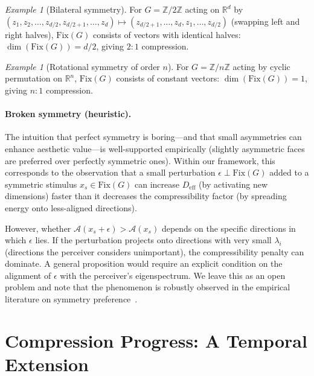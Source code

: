 \documentclass[journal]{IEEEtran}
\theoremstyle{definition}
\theoremstyle{remark}
\newtheorem{example}[theorem]{Example}
\newcommand{\R}{\mathbb{R}}
\begin{document}
\begin{example}[Bilateral symmetry]
For $G = \mathbb{Z}/2\mathbb{Z}$ acting on $\R^d$ by
$(z_1, z_2, \ldots, z_{d/2}, z_{d/2+1}, \ldots, z_d) \mapsto
(z_{d/2+1}, \ldots, z_d, z_1, \ldots, z_{d/2})$ (swapping left and
right halves), $\mathrm{Fix}(G)$ consists of vectors with identical
halves: $\dim(\mathrm{Fix}(G)) = d/2$, giving $2:1$ compression.
\end{example}

\begin{example}[Rotational symmetry of order $n$]
For $G = \mathbb{Z}/n\mathbb{Z}$ acting by cyclic permutation on
$\R^n$, $\mathrm{Fix}(G)$ consists of constant vectors:
$\dim(\mathrm{Fix}(G)) = 1$, giving $n:1$ compression.
\end{example}

\paragraph{Broken symmetry (heuristic).}
The intuition that perfect symmetry is boring---and that small
asymmetries can enhance aesthetic value---is well-supported
empirically (slightly asymmetric faces are preferred over perfectly
symmetric ones).  Within our framework, this corresponds to the
observation that a small perturbation $\epsilon \perp \mathrm{Fix}(G)$
added to a symmetric stimulus $x_s \in \mathrm{Fix}(G)$ can increase
$D_{\mathrm{eff}}$ (by activating new dimensions) faster than it
decreases the compressibility factor (by spreading energy onto
less-aligned directions).

However, whether $\mathcal{A}(x_s + \epsilon) > \mathcal{A}(x_s)$
depends on the specific directions in which $\epsilon$ lies.  If
the perturbation projects onto directions with very small $\lambda_i$
(directions the perceiver considers unimportant), the compressibility
penalty can dominate.  A general proposition would require an
explicit condition on the alignment of $\epsilon$ with the
perceiver's eigenspectrum.  We leave this as an open problem and
note that the phenomenon is robustly observed in the empirical
literature on symmetry preference~\cite{ramachandran1999science}.


\section{Compression Progress: A Temporal Extension}
\label{sec:temporal}
\end{document}
